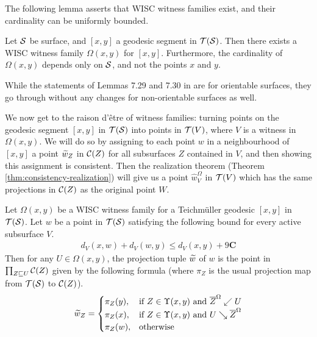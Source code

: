   The following lemma asserts that WISC witness families exist, and their cardinality can be uniformly bounded.
  \begin{lemma}
    Let $\mathcal{S}$ be surface, and $[x,y]$ a geodesic segment in $\mathcal{T}(\mathcal{S})$.
    Then there exists a WISC witness family $\Omega(x,y)$ for $[x,y]$.
    Furthermore, the cardinality of $\Omega(x,y)$ depends only on $\mathcal{S}$, and not the points $x$ and $y$.
  \end{lemma}
  \begin{remark}
    While the statements of Lemmas 7.29 and 7.30 in \textcite{dowdall2023lattice} are for orientable surfaces, they go through without any changes for non-orientable surfaces as well.
  \end{remark}

  We now get to the raison d'\^etre of witness families: turning points on the geodesic segment $[x,y]$ in $\mathcal{T}(\mathcal{S})$ into points in $\mathcal{T}(V)$, where $V$ is a witness in $\Omega(x,y)$.
  We will do so by assigning to each point $w$ in a neighbourhood of $[x,y]$ a point $\widetilde{w}_Z$ in $\mathcal{C}(Z)$ for all subsurfaces $Z$ contained in $V$, and then showing this assignment is consistent.
  Then the realization theorem (Theorem \ref{thm:consistency-realization}) will give us a point $\widehat{w}_V^{\Omega}$ in $\mathcal{T}(V)$ which has the same projections in $\mathcal{C}(Z)$ as the original point $W$.
  \begin{definition}
    \label{def:projection-tuple}
    Let $\Omega(x,y)$ be a WISC witness family for a Teichmüller geodesic $[x,y]$ in $\mathcal{T}(\mathcal{S})$.
    Let $w$ be a point in $\mathcal{T}(\mathcal{S})$ satisfying the following bound for every active subsurface $V$.
    \begin{align*}
      d_{V}(x, w) + d_{V}(w, y) \leq d_{V}(x, y) + 9 \mathbf{C}
    \end{align*}
    Then for any $U \in \Omega(x,y)$, the projection tuple $\widetilde{w}$ of $w$ is the point in $\prod_{Z \sqsubseteq U} \mathcal{C}(Z)$ given by the following formula (where $\pi_Z$ is the usual projection map from $\mathcal{T}(\mathcal{S})$ to $\mathcal{C}(Z)$).
    \begin{align*}
      \widetilde{w}_Z =
      \begin{cases}
        \pi_Z(y), & \text{if $Z \in \Upsilon(x,y)$ and $\overline{Z}^{\Omega} \swarrow U$} \\
        \pi_Z(x), & \text{if $Z \in \Upsilon(x,y)$ and $U \searrow \overline{Z}^{\Omega}$} \\
        \pi_Z(w), & \text{otherwise}
      \end{cases}
    \end{align*}
  \end{definition}

